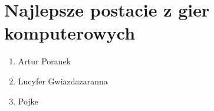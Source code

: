 \chapter{Najlepsze postacie z gier komputerowych}
\begin{enumerate}
    \item Artur Poranek
    \item Lucyfer Gwiazdazaranna
    \item Pojke
\end{enumerate}




